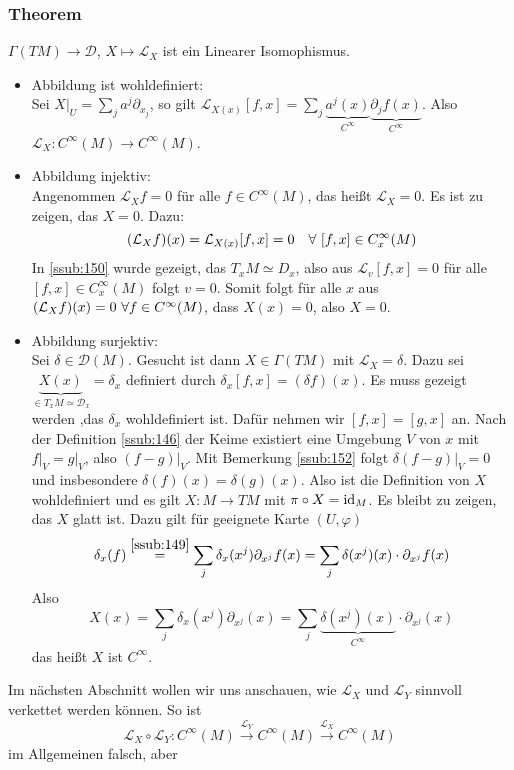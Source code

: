 \subsubsection{Theorem}
\label{ssub:153}
$\Gamma(TM) \to \mathcal{D}$, $X \mapsto \mathcal{L}_X$ ist ein Linearer Isomophismus.
\begin{itemize}
\item Abbildung ist wohldefiniert:\\
Sei $X\vert_U = \sum_j a^j \partial_{x_j}$, so gilt $\mathcal{L}_{X(x)}[f,x] = \sum_j \underbrace{a^j(x)}_{C^\infty} \underbrace{\partial_j f(x)}_{C^\infty}$. Also $\mathcal{L}_X: C^\infty(M) \to C^\infty(M)$.
\item Abbildung injektiv:\\
Angenommen $\mathcal{L}_X f = 0$ für alle $f\in C^\infty(M)$, das heißt $\mathcal{L}_X = 0$. Es ist zu zeigen, das $X = 0$. Dazu:
\[
\enbrace*{\mathcal{L}_X f}(x) = \mathcal{L}_{X(x)} [f,x] = 0\quad \forall\ [f,x]\in C^\infty_x (M)
\]
In \ref{ssub:150} wurde gezeigt, das $T_x M \simeq D_x$, also aus $\mathcal{L}_v [f,x] = 0$ für alle $[f,x]\in C^\infty_x (M)$ folgt $v = 0$. Somit folgt für alle $x$ aus $\enbrace*{\mathcal{L}_X f}(x) = 0\ \forall f\in C^\infty (M)$, dass $X(x) = 0$, also $X = 0$. 
\item Abbildung surjektiv:\\
Sei $\delta \in \mathcal{D}(M)$. Gesucht ist dann $X\in \Gamma(TM)$ mit $\mathcal{L}_X = \delta$. Dazu sei $\underbrace{X(x)}_{\in T_x M \simeq \mathcal{D}_x} = \delta_x$ definiert durch $\delta_x [f,x] = (\delta f)(x)$. Es muss gezeigt werden ,das $\delta_x$ wohldefiniert ist. Dafür nehmen wir $[f,x] = [g,x]$ an. Nach der Definition \ref{ssub:146} der Keime existiert eine Umgebung $V$ von $x$ mit $f\vert_V = g\vert_V$, also $(f-g)\vert_V$. Mit Bemerkung \ref{ssub:152} folgt $\delta(f-g)\vert_V = 0$ und insbesondere $\delta(f)(x) = \delta(g)(x)$. Also ist die Definition von $X$ wohldefiniert und es gilt $X: M \to TM$ mit $\pi \circ X = \operatorname{id}_M$. Es bleibt zu zeigen, das $X$ glatt ist. Dazu gilt für geeignete Karte $(U,\varphi)$ 
\[
\delta_x(f) \overset{\ref{ssub:149}}{=} \sum_j \delta_x (x^j) \partial_{x^j} f(x) = \sum_j \delta(x^j)(x)\cdot \partial_{x^j} f(x) 
\]
Also
\[
X(x) = \sum_j \delta_x (x^j) \partial_{x^j} (x) = \sum_j \underbrace{\delta(x^j)(x)}_{C^\infty}\cdot \partial_{x^j} (x)
\]
das heißt $X$ ist $C^\infty$.
\end{itemize}
Im nächsten Abschnitt wollen wir uns anschauen, wie $\mathcal{L}_X$ und $\mathcal{L}_Y$ sinnvoll verkettet werden können. So ist 
\[
\mathcal{L}_X \circ \mathcal{L}_Y: C^\infty (M) \xrightarrow{\mathcal{L}_Y} C^\infty (M) \xrightarrow{\mathcal{L}_X} C^\infty (M)
\]
im Allgemeinen falsch, aber

